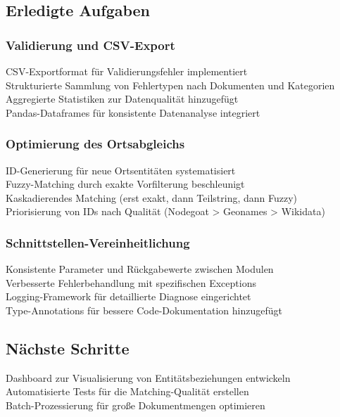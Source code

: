 \documentclass{article}
\begin{document}
\subsection*{Erledigte Aufgaben}
\subsubsection*{\small Validierung und CSV-Export}
 CSV-Exportformat für Validierungsfehler implementiert\\
 Strukturierte Sammlung von Fehlertypen nach Dokumenten und Kategorien\\
 Aggregierte Statistiken zur Datenqualität hinzugefügt\\
 Pandas-Dataframes für konsistente Datenanalyse integriert

\subsubsection*{\small Optimierung des Ortsabgleichs}
 ID-Generierung für neue Ortsentitäten systematisiert\\
 Fuzzy-Matching durch exakte Vorfilterung beschleunigt\\
 Kaskadierendes Matching (erst exakt, dann Teilstring, dann Fuzzy)\\
 Priorisierung von IDs nach Qualität (Nodegoat > Geonames > Wikidata)

\subsubsection*{\small Schnittstellen-Vereinheitlichung}
 Konsistente Parameter und Rückgabewerte zwischen Modulen\\
 Verbesserte Fehlerbehandlung mit spezifischen Exceptions\\
 Logging-Framework für detaillierte Diagnose eingerichtet\\
 Type-Annotations für bessere Code-Dokumentation hinzugefügt

\subsection*{Nächste Schritte}
 Dashboard zur Visualisierung von Entitätsbeziehungen entwickeln\\
 Automatisierte Tests für die Matching-Qualität erstellen\\
 Batch-Prozessierung für große Dokumentmengen optimieren
\end{document}
